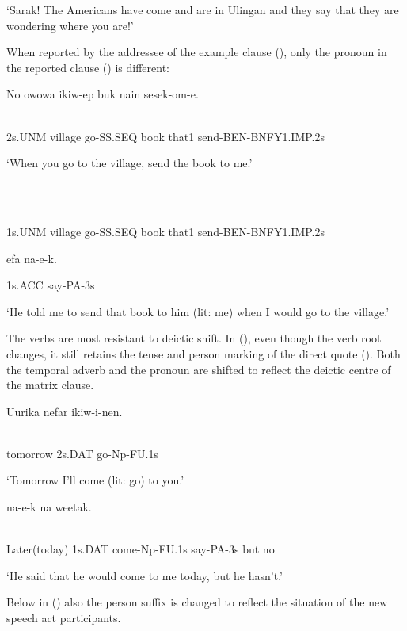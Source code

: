 `Sarak! The Americans have come and are in Ulingan and they say that they are wondering where you are!'

When reported by the addressee of the example clause (), only the pronoun in the reported clause () is different:

\ea%
\label{ex:x1281}
\gll No  owowa  ikiw-ep  buk  nain  sesek-om-e. \\
      \\
\glt
\z

2s.UNM  village  go-SS.SEQ  book  that1  send-BEN-BNFY1.IMP.2s

`When you go to the village, send the book to me.'

\ea%
\label{ex:x1282}
  \\
      \\
\glt
\z

1s.UNM  village  go-SS.SEQ  book  that1  send-BEN-BNFY1.IMP.2s

efa  na-e-k.

1s.ACC  say-PA-3s

`He told me to send that book to him (lit: me) when I would go to the village.'

The verbs are most resistant to deictic shift. In (), even though the verb root changes, it still retains the tense and person marking of the direct quote (). Both the temporal adverb and the pronoun are shifted to reflect the deictic centre of the matrix clause.

\ea%
\label{ex:x1264}
\gll Uurika  nefar  ikiw-i-nen. \\
      \\
\glt
\z

tomorrow  2s.DAT  go-Np-FU.1s

`Tomorrow I'll come (lit: go) to you.'

\ea%
\label{ex:x1265}
  na-e-k  na  weetak. \\
      \\
\glt
\z

Later(today)  1s.DAT  come-Np-FU.1s  say-PA-3s  but  no

`He said that he would come to me today, but he hasn't.'

Below in () also the person suffix is changed to reflect the situation of the new speech act participants. 

